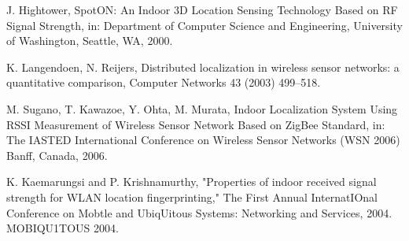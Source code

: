 \documentclass[conference]{IEEEtran}
\begin{document}
\begin{thebibliography}{1}
J. Hightower, SpotON: An Indoor 3D Location Sensing Technology Based on RF
Signal Strength, in: Department of Computer Science and Engineering,
University of Washington, Seattle, WA, 2000.

K. Langendoen, N. Reijers, Distributed localization in wireless sensor networks:
a quantitative comparison, Computer Networks 43 (2003) 499–518.

M. Sugano, T. Kawazoe, Y. Ohta, M. Murata, Indoor Localization System Using
RSSI Measurement of Wireless Sensor Network Based on ZigBee Standard, in:
The IASTED International Conference on Wireless Sensor Networks (WSN
2006) Banff, Canada, 2006.

K. Kaemarungsi and P. Krishnamurthy, "Properties of indoor
received signal strength for WLAN location fingerprinting," The First Annual InternatIOnal Conference on Mobtle and UbiqUitous
Systems: Networking and Services, 2004. MOBIQU1TOUS 2004.


\end{thebibliography}






\end{document}
